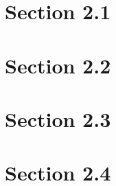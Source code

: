 \lipsum[1]
\section{Section 2.1}
    
\section{Section 2.2}\label{chap:2_2-numerical_method}
    
\section{Section 2.3}
    
\section{Section 2.4}
    
    